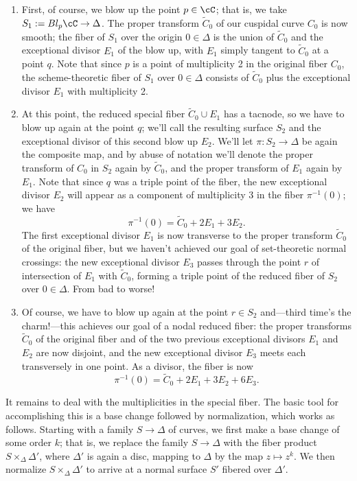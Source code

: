 \begin{enumerate}

\item First, of course, we blow up the point $p \in \cC$; that is, we take $S_1 := Bl_p\cC \to \Delta$. The proper transform $\tilde C_0$ of our cuspidal curve $C_0$ is now smooth; the fiber of $S_1$ over the origin $0 \in \Delta$ is the union of $\tilde C_0$ and the exceptional divisor $E_1$ of the blow up, with $E_1$ simply tangent to $
\tilde C_0$ at a point $q$. Note that since $p$ is a point of multiplicity 2 in the original fiber $C_0$,  the scheme-theoretic fiber of $S_1$ over $0 \in \Delta$ consists of $\tilde C_0$ plus the exceptional divisor $E_1$ with multiplicity 2.

\item At this point, the reduced special fiber $\tilde C_0 \cup E_1$ has a tacnode, so we have to blow up again at the point $q$; we'll call the resulting surface $S_2$ and the exceptional divisor of this second blow up $E_2$. We'll let $\pi : S_2 \to \Delta$ be again the composite map, and by abuse of notation we'll denote the proper transform of $C_0$ in $S_2$ again by $\tilde C_0$, and the proper transform of $E_1$ again by $E_1$. Note that since $q$ was a triple point of the fiber, the new exceptional divisor $E_2$ will appear as a component of multiplicity 3 in the fiber $\pi^{-1}(0)$; we have
$$
\pi^{-1}(0) = \tilde C_0 + 2E_1 + 3E_2.
$$
The first exceptional divisor $E_1$ is now transverse to the proper transform $\tilde C_0$ of the original fiber, but we haven't achieved our goal of set-theoretic normal crossings: the new exceptional divisor $E_3$ passes through the point $r$ of intersection of $E_1$ with $\tilde C_0$, forming a triple point of the reduced fiber of $S_2$ over $0 \in \Delta$. From bad to worse!

\item Of course, we have to blow up again at the point $r \in S_2$ and---third time's the charm!---this achieves our goal of a nodal reduced fiber: the proper transforms $\tilde C_0$ of the original fiber and of the two previous exceptional divisors $E_1$ and $E_2$ are now disjoint, and the new exceptional divisor $E_3$ meets each transversely in one point. As a divisor, the fiber is now
$$
\pi^{-1}(0) = \tilde C_0 + 2E_1 + 3E_2 + 6E_3.
$$
\end{enumerate}

It remains to deal with the multiplicities in the special fiber. The basic tool for accomplishing this is a base change followed by normalization, which works as follows. Starting with a family $S \to \Delta$ of curves, we first make a base change of some order $k$; that is, we replace the family $S \to \Delta$ with the fiber product $S \times_\Delta \Delta'$, where $\Delta'$ is again a disc, mapping to $\Delta$ by the map $z \mapsto z^k$. We then normalize $S \times_\Delta \Delta'$ to arrive at a normal surface $S'$ fibered over $\Delta'$.


